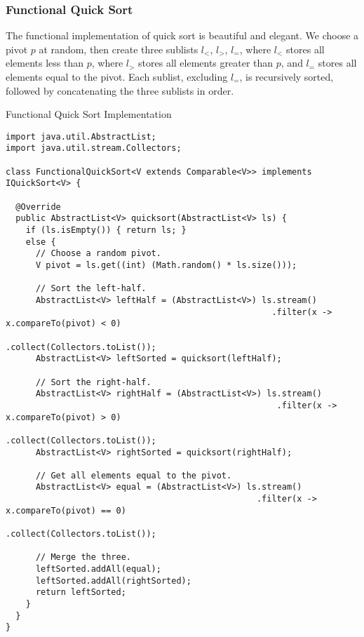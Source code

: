 \subsubsection*{Functional Quick Sort}
The functional implementation of quick sort is beautiful and elegant. We choose a pivot $p$ at random, then create three sublists $l_<$, $l_>$, $l_=$, where $l_<$ stores all elements less than $p$, where $l_>$ stores all elements greater than $p$, and $l_=$ stores all elements equal to the pivot. Each sublist, excluding $l_=$, is recursively sorted, followed by concatenating the three sublists in order. 

\begin{cl}{Functional Quick Sort Implementation}
\begin{lstlisting}[language=MyJava]
import java.util.AbstractList;
import java.util.stream.Collectors;

class FunctionalQuickSort<V extends Comparable<V>> implements IQuickSort<V> {

  @Override
  public AbstractList<V> quicksort(AbstractList<V> ls) {
    if (ls.isEmpty()) { return ls; }
    else {
      // Choose a random pivot.
      V pivot = ls.get((int) (Math.random() * ls.size()));

      // Sort the left-half.
      AbstractList<V> leftHalf = (AbstractList<V>) ls.stream()
                                                     .filter(x -> x.compareTo(pivot) < 0)
                                                     .collect(Collectors.toList());
      AbstractList<V> leftSorted = quicksort(leftHalf);

      // Sort the right-half.
      AbstractList<V> rightHalf = (AbstractList<V>) ls.stream()
                                                      .filter(x -> x.compareTo(pivot) > 0)
                                                      .collect(Collectors.toList());
      AbstractList<V> rightSorted = quicksort(rightHalf);

      // Get all elements equal to the pivot.
      AbstractList<V> equal = (AbstractList<V>) ls.stream()
                                                  .filter(x -> x.compareTo(pivot) == 0)
                                                  .collect(Collectors.toList());

      // Merge the three.
      leftSorted.addAll(equal);
      leftSorted.addAll(rightSorted);
      return leftSorted;
    }
  }
}
\end{lstlisting}
\end{cl}

